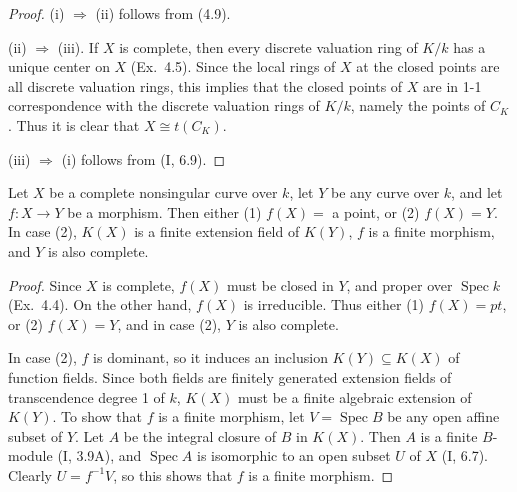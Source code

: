 

\DeclareMathOperator{\Spec}{Spec}
\DeclareMathOperator{\Div}{Div}
\DeclareMathOperator{\Cl}{Cl}

\begin{proof}
(i) $\Rightarrow$ (ii) follows from (4.9).

(ii) $\Rightarrow$ (iii). If $X$ is complete, then every discrete valuation
ring of $K/k$ has a unique center on $X$ (Ex.\ 4.5). Since the local rings of
$X$ at the closed points are all discrete valuation rings, this implies that
the closed points of $X$ are in 1-1 correspondence with the discrete
valuation rings of $K/k$, namely the points of $C_K$. Thus it is clear that
$X \cong t(C_K)$.

(iii) $\Rightarrow$ (i) follows from (I, 6.9).
\end{proof}

\begin{proposition}[6.8]
Let $X$ be a complete nonsingular curve over $k$, let $Y$ be any curve over
$k$, and let $f\colon X \to Y$ be a morphism. Then either (1) $f(X) =$ a
point, or (2) $f(X) = Y$. In case (2), $K(X)$ is a finite extension field of
$K(Y)$, $f$ is a finite morphism, and $Y$ is also complete.
\end{proposition}

\begin{proof}
Since $X$ is complete, $f(X)$ must be closed in $Y$, and proper over
$\Spec k$ (Ex.\ 4.4). On the other hand, $f(X)$ is irreducible. Thus either
(1) $f(X) = pt$, or (2) $f(X) = Y$, and in case (2), $Y$ is also complete.

In case (2), $f$ is dominant, so it induces an inclusion $K(Y) \subseteq
K(X)$ of function fields. Since both fields are finitely generated extension
fields of transcendence degree 1 of $k$, $K(X)$ must be a finite algebraic
extension of $K(Y)$. To show that $f$ is a finite morphism, let $V = \Spec B$
be any open affine subset of $Y$. Let $A$ be the integral closure of $B$ in
$K(X)$. Then $A$ is a finite $B$-module (I, 3.9A), and $\Spec A$ is
isomorphic to an open subset $U$ of $X$ (I, 6.7). Clearly $U = f^{-1}V$, so
this shows that $f$ is a finite morphism.
\end{proof}

